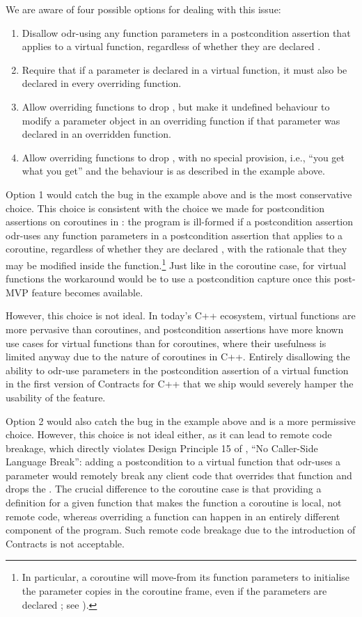 We are aware of four possible options for dealing with this issue:
\begin{enumerate}
\item Disallow odr-using any function parameters in a postcondition assertion that applies to a virtual function, regardless of whether they are declared .
\item Require that if a parameter is declared  in a virtual function, it must also be declared  in every overriding function.
\item Allow overriding functions to drop , but make it undefined behaviour to modify a parameter object in an overriding function if that parameter was declared  in an overridden function.
\item Allow overriding functions to drop , with no special provision, i.e., ``you get what you get'' and the behaviour is as described in the example above.
\end{enumerate}
Option 1 would catch the bug in the example above and is the most conservative choice. This choice is consistent with the choice we made for postcondition assertions on coroutines in \cite{P2900R10}: the program is ill-formed if a postcondition assertion odr-uses any function parameters in a postcondition assertion that applies to a coroutine, regardless of whether they are declared , with the rationale that they may be modified inside the function.\footnote{In particular, a coroutine will move-from its function parameters to initialise the parameter copies in the coroutine frame, even if the parameters are declared ; see \cite{P3387R0}).} Just like in the coroutine case, for virtual functions the workaround would be to use a postcondition capture \cite{P3098R0} once this post-MVP feature becomes available.

However, this choice is not ideal. In today's C++ ecosystem, virtual functions are more pervasive than coroutines, and postcondition assertions have more known use cases for virtual functions than for coroutines, where their usefulness is limited anyway due to the nature of coroutines in C++. Entirely disallowing the ability to odr-use parameters in the postcondition assertion of a virtual function in the first version of Contracts for C++ that we ship would severely hamper the usability of the feature.


Option 2 would also catch the bug in the example above and is a more permissive choice. However, this choice is not ideal either, as it can lead to remote code breakage, which directly violates Design Principle 15 of \cite{P2900R10}, ``No Caller-Side Language Break'': adding a postcondition to a virtual function that odr-uses a  parameter would remotely break any client code that overrides that function and drops the . The crucial difference to the coroutine case is that providing a definition for a given function that makes the function a coroutine is local, not remote code, whereas overriding a function can happen in an entirely different component of the program. Such remote code breakage due to the introduction of Contracts is not acceptable.

